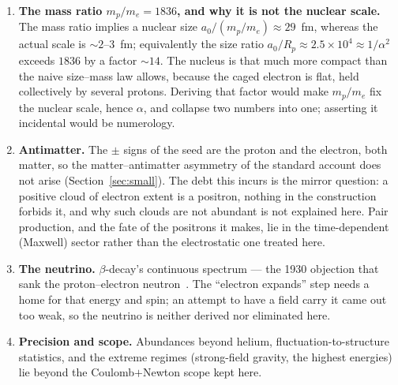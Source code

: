 \documentclass[11pt]{article}
\begin{document}
\begin{enumerate}
short-wavelength power, as in item~2 above; short of that, supplying $\varphi_E$ with a law of motion would close
only the first.
\item \textbf{The mass ratio $m_p/m_e=1836$, and why it is not the nuclear scale.} The mass ratio implies a nuclear
size $a_0/(m_p/m_e)\approx29$~fm, whereas the actual scale is ${\sim}2$--$3$~fm; equivalently the size ratio
$a_0/R_p\approx2.5\times10^4\approx1/\alpha^2$ exceeds $1836$ by a factor ${\sim}14$. The nucleus is that much more
compact than the naive size--mass law allows, because the caged electron is flat, held collectively by several
protons. Deriving that factor would make $m_p/m_e$ fix the nuclear scale, hence $\alpha$, and collapse two numbers
into one; asserting it incidental would be numerology.
\item \textbf{Antimatter.} The $\pm$ signs of the seed are the proton and the electron, both matter, so the
matter--antimatter asymmetry of the standard account does not arise (Section~\ref{sec:small}). The debt this
incurs is the mirror question: a positive cloud of electron extent is a positron, nothing in the construction
forbids it, and why such clouds are not abundant is not explained here. Pair production, and the fate of the
positrons it makes, lie in the time-dependent (Maxwell) sector rather than the electrostatic one treated here.
\item \textbf{The neutrino.} $\beta$-decay's continuous spectrum --- the 1930 objection that sank the
proton--electron neutron~\cite{pauli}. The ``electron expands'' step needs a home for that energy and spin; an
attempt to have a field carry it came out too weak, so the neutrino is neither derived nor eliminated here.
\item \textbf{Precision and scope.} Abundances beyond helium, fluctuation-to-structure statistics, and the extreme
regimes (strong-field gravity, the highest energies) lie beyond the Coulomb$+$Newton scope kept here.
\end{enumerate}
\end{document}
